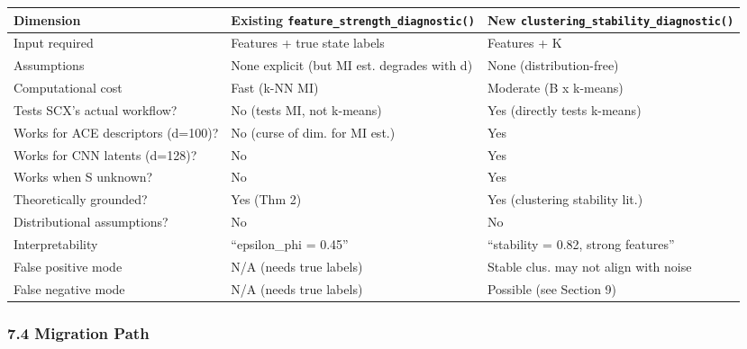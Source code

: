 \documentclass[
  12pt,
]{article}
\begin{document}
\begin{longtable}[]{@{}
  >{\raggedright\arraybackslash}p{}
  >{\raggedright\arraybackslash}p{}
  >{\raggedright\arraybackslash}p{}@{}}
\toprule\noalign{}
\begin{minipage}[b]{\linewidth}\raggedright
Dimension
\end{minipage} & \begin{minipage}[b]{\linewidth}\raggedright
Existing \texttt{feature\_strength\_diagnostic()}
\end{minipage} & \begin{minipage}[b]{\linewidth}\raggedright
New \texttt{clustering\_stability\_diagnostic()}
\end{minipage} \\
\midrule\noalign{}
\endhead
\bottomrule\noalign{}
\endlastfoot
Input required & Features + true state labels & Features + K \\
Assumptions & None explicit (but MI est. degrades with d) & None
(distribution-free) \\
Computational cost & Fast (k-NN MI) & Moderate (B x k-means) \\
Tests SCX's actual workflow? & No (tests MI, not k-means) & Yes
(directly tests k-means) \\
Works for ACE descriptors (d=100)? & No (curse of dim. for MI est.) &
Yes \\
Works for CNN latents (d=128)? & No & Yes \\
Works when S unknown? & No & Yes \\
Theoretically grounded? & Yes (Thm 2) & Yes (clustering stability
lit.) \\
Distributional assumptions? & No & No \\
Interpretability & ``epsilon\_phi = 0.45'' & ``stability = 0.82, strong
features'' \\
False positive mode & N/A (needs true labels) & Stable clus. may not
align with noise \\
False negative mode & N/A (needs true labels) & Possible (see Section
9) \\
\end{longtable}

\subsubsection{7.4 Migration Path}\label{migration-path}
\end{document}
